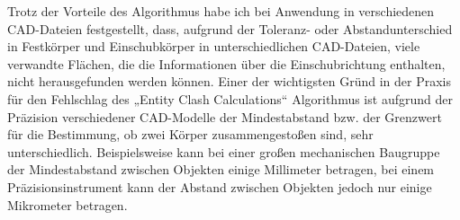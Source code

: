\documentclass[14pt,a4paper,titlepage]{article}
\begin{document}
\begin{itemize}
			
				 Trotz der Vorteile des Algorithmus habe ich bei Anwendung in verschiedenen CAD-Dateien festgestellt, dass, aufgrund der Toleranz- oder Abstandunterschied in Festkörper und Einschubkörper in unterschiedlichen CAD-Dateien, viele verwandte Flächen, die die Informationen über die Einschubrichtung enthalten, nicht herausgefunden werden können. Einer der wichtigsten Gründ in der Praxis für den Fehlschlag des „Entity Clash Calculations“ Algorithmus ist aufgrund der Präzision verschiedener CAD-Modelle der Mindestabstand bzw. der Grenzwert für die Bestimmung, ob zwei Körper zusammengestoßen sind, sehr unterschiedlich. Beispielsweise kann bei einer großen mechanischen Baugruppe der Mindestabstand zwischen Objekten einige Millimeter betragen, bei einem Präzisionsinstrument kann der Abstand zwischen Objekten jedoch nur einige Mikrometer betragen.
				 \pagebreak
				 

\end{itemize}
\end{document}
